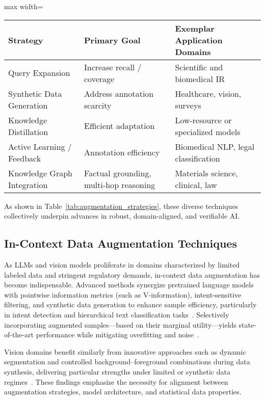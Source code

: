 \documentclass[sigconf]{acmart}
\begin{document}
\begin{table*}[htbp]
\centering
\caption{Representative Knowledge and Context Augmentation Strategies}
\label{tab:augmentation_strategies}
\begin{adjustbox}{max width=\textwidth}
\begin{tabular}{lll}
\toprule
\textbf{Strategy} & \textbf{Primary Goal} & \textbf{Exemplar Application Domains} \\
\midrule
Query Expansion         & Increase recall / coverage   & Scientific and biomedical IR \\
Synthetic Data Generation & Address annotation scarcity & Healthcare, vision, surveys \\
Knowledge Distillation  & Efficient adaptation        & Low-resource or specialized models \\
Active Learning / Feedback & Annotation efficiency        & Biomedical NLP, legal classification \\
Knowledge Graph Integration & Factual grounding, multi-hop reasoning & Materials science, clinical, law \\
\bottomrule
\end{tabular}
\end{adjustbox}
\end{table*}

As shown in Table~\ref{tab:augmentation_strategies}, these diverse techniques collectively underpin advances in robust, domain-aligned, and verifiable AI.

\subsection{In-Context Data Augmentation Techniques}

As LLMs and vision models proliferate in domains characterized by limited labeled data and stringent regulatory demands, in-context data augmentation has become indispensable. Advanced methods synergize pretrained language models with pointwise information metrics (such as V-information), intent-sensitive filtering, and synthetic data generation to enhance sample efficiency, particularly in intent detection and hierarchical text classification tasks~\cite{ref61}. Selectively incorporating augmented samples—based on their marginal utility—yields state-of-the-art performance while mitigating overfitting and noise~\cite{ref61}.

Vision domains benefit similarly from innovative approaches such as dynamic segmentation and controlled background–foreground combinations during data synthesis, delivering particular strengths under limited or synthetic data regimes~\cite{ref62}. These findings emphasize the necessity for alignment between augmentation strategies, model architecture, and statistical data properties.
\end{document}
